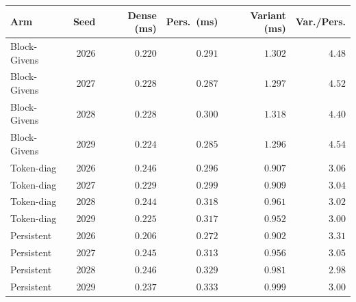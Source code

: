 \begin{tabular}{lrrrrr}
\toprule
Arm & Seed & Dense (ms) & Pers.\ (ms) & Variant (ms) & Var./Pers. \\
\midrule
Block-Givens & 2026 & $0.220$ & $0.291$ & $1.302$ & $4.48$ \\
Block-Givens & 2027 & $0.228$ & $0.287$ & $1.297$ & $4.52$ \\
Block-Givens & 2028 & $0.228$ & $0.300$ & $1.318$ & $4.40$ \\
Block-Givens & 2029 & $0.224$ & $0.285$ & $1.296$ & $4.54$ \\
Token-diag & 2026 & $0.246$ & $0.296$ & $0.907$ & $3.06$ \\
Token-diag & 2027 & $0.229$ & $0.299$ & $0.909$ & $3.04$ \\
Token-diag & 2028 & $0.244$ & $0.318$ & $0.961$ & $3.02$ \\
Token-diag & 2029 & $0.225$ & $0.317$ & $0.952$ & $3.00$ \\
Persistent & 2026 & $0.206$ & $0.272$ & $0.902$ & $3.31$ \\
Persistent & 2027 & $0.245$ & $0.313$ & $0.956$ & $3.05$ \\
Persistent & 2028 & $0.246$ & $0.329$ & $0.981$ & $2.98$ \\
Persistent & 2029 & $0.237$ & $0.333$ & $0.999$ & $3.00$ \\
\bottomrule
\end{tabular}
